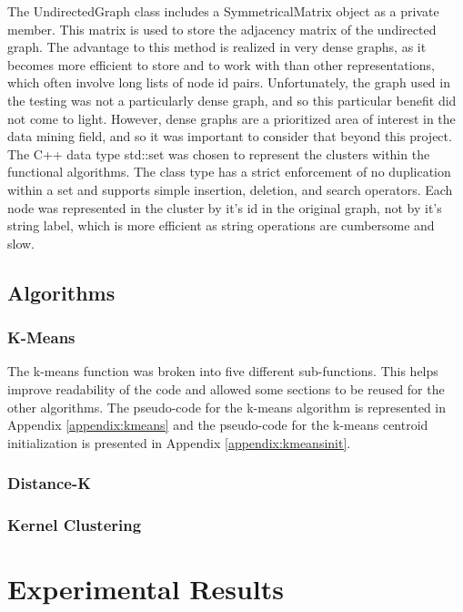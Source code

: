 \documentclass[12pt]{article}
\begin{document}
The UndirectedGraph class includes a SymmetricalMatrix object as a private member. This matrix is used to store the adjacency matrix of the undirected graph. The advantage to this method is realized in very dense graphs, as it becomes more efficient to store and to work with than other representations, which often involve long lists of node id pairs. Unfortunately, the graph used in the testing was not a particularly dense graph, and so this particular benefit did not come to light. However, dense graphs are a prioritized area of interest in the data mining field, and so it was important to consider that beyond this project.
\newline\newline
The C++ data type std::set was chosen to represent the clusters within the functional algorithms. The class type has a strict enforcement of no duplication within a set and supports simple insertion, deletion, and search operators. Each node was represented in the cluster by it's id in the original graph, not by it's string label, which is more efficient as string operations are cumbersome and slow.

\subsection{Algorithms}

\subsubsection{K-Means}
The k-means function was broken into five different sub-functions. This helps improve readability of the code and allowed some sections to be reused for the other algorithms. The pseudo-code for the k-means algorithm is represented in Appendix \ref{appendix:kmeans} and the pseudo-code for the k-means centroid initialization is presented in Appendix \ref{appendix:kmeansinit}\cite{kmeans}.

\subsubsection{Distance-K}
\subsubsection{Kernel Clustering}

\newpage
\section{Experimental Results}
\end{document}
